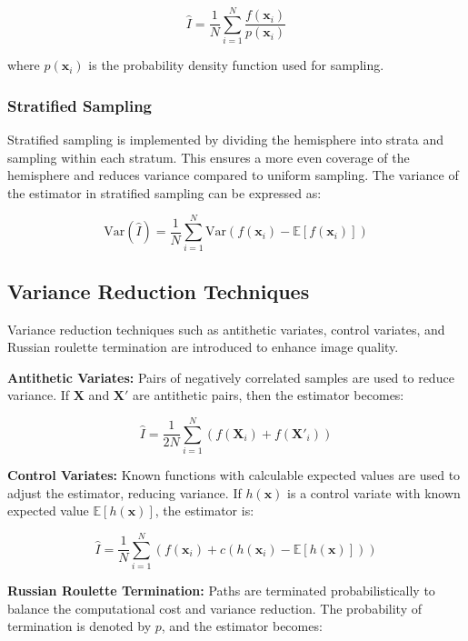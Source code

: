 \documentclass[12pt]{article}
\begin{document}
\begin{equation}
    \hat{I} = \frac{1}{N} \sum_{i=1}^{N} \frac{f(\mathbf{x}_i)}{p(\mathbf{x}_i)}
\end{equation}

where $p(\mathbf{x}_i)$ is the probability density function used for sampling.

\subsubsection{Stratified Sampling}
Stratified sampling is implemented by dividing the hemisphere into strata and sampling within each stratum. This ensures a more even coverage of the hemisphere and reduces variance compared to uniform sampling. The variance of the estimator in stratified sampling can be expressed as:

\begin{equation}
    \text{Var}(\hat{I}) = \frac{1}{N} \sum_{i=1}^{N} \text{Var}(f(\mathbf{x}_i) - \mathbb{E}[f(\mathbf{x}_i)])
\end{equation}

\subsection{Variance Reduction Techniques}
Variance reduction techniques such as antithetic variates, control variates, and Russian roulette termination are introduced to enhance image quality.

\textbf{Antithetic Variates:} Pairs of negatively correlated samples are used to reduce variance. If $\mathbf{X}$ and $\mathbf{X}'$ are antithetic pairs, then the estimator becomes:

\begin{equation}
    \hat{I} = \frac{1}{2N} \sum_{i=1}^{N} \left( f(\mathbf{X}_i) + f(\mathbf{X}'_i) \right)
\end{equation}

\textbf{Control Variates:} Known functions with calculable expected values are used to adjust the estimator, reducing variance. If $h(\mathbf{x})$ is a control variate with known expected value $\mathbb{E}[h(\mathbf{x})]$, the estimator is:

\begin{equation}
    \hat{I} = \frac{1}{N} \sum_{i=1}^{N} \left( f(\mathbf{x}_i) + c (h(\mathbf{x}_i) - \mathbb{E}[h(\mathbf{x})]) \right)
\end{equation}

\textbf{Russian Roulette Termination:} Paths are terminated probabilistically to balance the computational cost and variance reduction. The probability of termination is denoted by $p$, and the estimator becomes:
\end{document}
